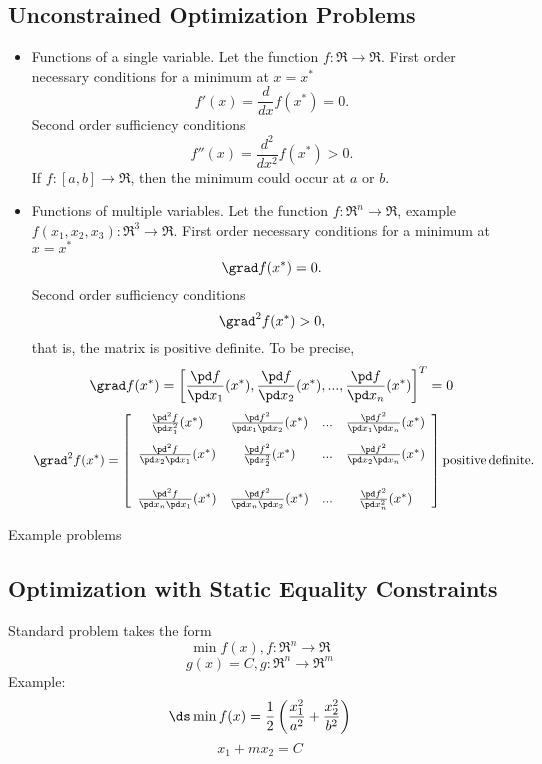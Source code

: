 \subsection{Unconstrained Optimization Problems}
\begin{itemize}
\item Functions of a single variable. Let the function $f: \Re \rightarrow \Re$. First order necessary conditions for a minimum at $x = x^*$
$$f'(x) = \frac{d}{dx}f(x^*) = 0.$$
Second order sufficiency conditions
$$f''(x) = \frac{d^2}{dx^2}f(x^*) > 0.$$
If $f:[a,b]\rightarrow\Re$, then the minimum could occur at $a$ or $b$.


\item Functions of multiple variables. Let the function $f: \Re^n \rightarrow \Re$, example $f(x_1, x_2, x_3):\Re^3 \rightarrow \Re$. First order necessary conditions for a minimum at $x = x^*$
$$\grad f(x^*) = 0.$$ Second order sufficiency conditions  $$\grad^2 f(x^*) >0, $$ that is, the matrix is positive definite. To be precise,
$$\grad f(x^*) = \left[ \frac{\pd f}{\pd x_1}(x^*), \frac{\pd f}{\pd x_2}(x^*), ..., \frac{\pd f}{\pd x_n}(x^*)\right]^T = 0$$
$$\grad^2 f(x^*) = \left[\begin{array}{cccc} \frac{\pd^2 f}{\pd x_1^2}(x^*)& \frac{\pd f^2}{\pd x_1 \pd x_2}(x^*)& ... & \frac{\pd f^2}{\pd x_1\pd x_n}(x^*)\\[1em]
\frac{\pd^2 f}{\pd x_2\pd x_1}(x^*)& \frac{\pd f^2}{\pd x_2^2}(x^*)& ... & \frac{\pd f^2}{\pd x_2\pd x_n}(x^*)\\[2em]
\frac{\pd^2 f}{\pd x_n\pd x_1}(x^*)& \frac{\pd f^2}{\pd x_n \pd x_2}(x^*)& ... & \frac{\pd f^2}{\pd x_n^2}(x^*)
\end{array}\right] {\rm positive\, definite}.$$


\end{itemize}
Example problems
\newpage

\subsection{Optimization with Static Equality Constraints}
Standard problem takes the form
$$\min f(x), f:\Re^n \rightarrow \Re$$
\hspace{.15in}{\it subject to}
$$ g(x) = C, g:\Re^n\rightarrow\Re^m$$
Example:  $$\ds \min f(x) = \frac 12 \left(\frac{x_1^2}{a^2}+\frac{x_2^2}{b^2}\right)$$
\hspace{1.5in}{\it subject to} $$x_1 + mx_2 = C$$

